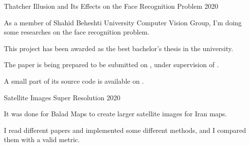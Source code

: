 

\begin{cvprojects}

  \cvproject
    {Thatcher Illusion and Its Effects on the Face Recognition Problem} %
    {} %
    {} %
    {2020} %
    {
      \begin{cvitems} %
        \item {As a member of Shahid Beheshti University Computer Vision Group, I'm doing some researches on the face recognition problem.}
        \item {This project has been awarded as the best bachelor's thesis in the university.}
        \item {The paper is being prepared to be submitted on , under supervision of .}
        \item {A small part of its source code is available on .}
      \end{cvitems}
    }

  \cvproject
    {Satellite Images Super Resolution} %
    {} %
    {} %
    {2020} %
    {
      \begin{cvitems} %
        \item {It was done for Balad Maps to create larger satellite images for Iran maps.}
        \item {I read different papers and implemented some different methods, and I compared them with a valid metric.}
      \end{cvitems}
    }


\end{cvprojects}
